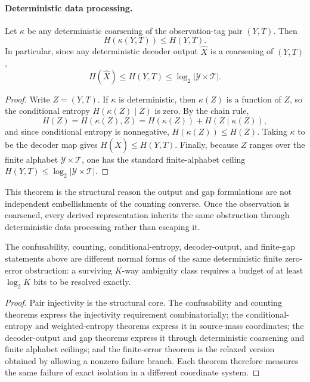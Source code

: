 \paragraph{Deterministic data processing.}
Let $\kappa$ be any deterministic coarsening of the observation-tag pair $(Y,T)$. Then
\[
H(\kappa(Y,T)) \le H(Y,T).
\]
In particular, since any deterministic decoder output $\hat X$ is a coarsening of $(Y,T)$,
\[
H(\hat X)\le H(Y,T)\le \log_2 |\mathcal Y\times \mathcal T|.
\] 

\begin{proof}
Write $Z=(Y,T)$. If $\kappa$ is deterministic, then $\kappa(Z)$ is a function of $Z$, so the conditional entropy $H(\kappa(Z)\mid Z)$ is zero. By the chain rule,
\[
H(Z)=H(\kappa(Z),Z)=H(\kappa(Z))+H(Z\mid \kappa(Z)),
\]
and since conditional entropy is nonnegative, $H(\kappa(Z))\le H(Z)$. Taking $\kappa$ to be the decoder map gives $H(\hat X)\le H(Y,T)$. Finally, because $Z$ ranges over the finite alphabet $\mathcal Y\times\mathcal T$, one has the standard finite-alphabet ceiling $H(Y,T)\le \log_2 |\mathcal Y\times\mathcal T|$.
\end{proof}

This theorem is the structural reason the output and gap formulations are not independent embellishments of the counting converse. Once the observation is coarsened, every derived representation inherits the same obstruction through deterministic data processing rather than escaping it.

\begin{proposition}\label{thm:equivalence-viewpoint}
The confusability, counting, conditional-entropy, decoder-output, and finite-gap statements above are different normal forms of the same deterministic finite zero-error obstruction: a surviving $K$-way ambiguity class requires a budget of at least $\log_2 K$ bits to be resolved exactly.
\end{proposition}

\begin{proof}
Pair injectivity is the structural core. The confusability and counting theorems express the injectivity requirement combinatorially; the conditional-entropy and weighted-entropy theorems express it in source-mass coordinates; the decoder-output and gap theorems express it through deterministic coarsening and finite alphabet ceilings; and the finite-error theorem is the relaxed version obtained by allowing a nonzero failure branch. Each theorem therefore measures the same failure of exact isolation in a different coordinate system.
\end{proof}

